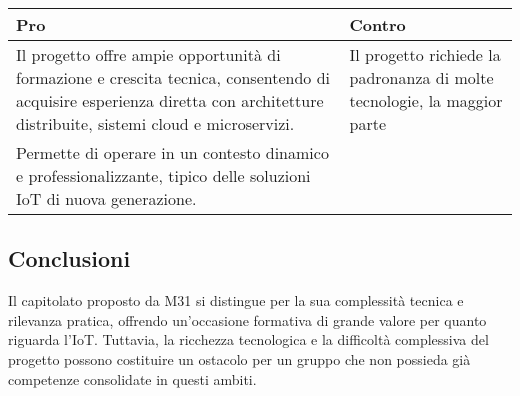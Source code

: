 \documentclass[a4paper,12pt]{article}
\begin{document}
{{        \begin{center} 
            \begin{tabular}{|p{9cm}|p{5cm}|}
                \hline
                \textbf{Pro} & \textbf{Contro} \\
                \hline
                Il progetto offre ampie opportunità di formazione e crescita tecnica, consentendo di acquisire esperienza diretta con architetture distribuite, sistemi cloud e microservizi. & Il progetto richiede la padronanza di molte tecnologie, la maggior parte \\
                \hline
                Permette di operare in un contesto dinamico e professionalizzante, tipico delle soluzioni IoT di nuova generazione. & \\
                \hline
            \end{tabular}
        \end{center}

    }

    \subsection*{Conclusioni}{
        Il capitolato proposto da M31 si distingue per la sua complessità tecnica e rilevanza pratica, offrendo un'occasione formativa di grande valore per quanto riguarda l'IoT. Tuttavia, la ricchezza tecnologica e la difficoltà complessiva del progetto possono costituire un ostacolo per un gruppo che non possieda già competenze consolidate in questi ambiti.
    }
}

\newpage
\end{document}
